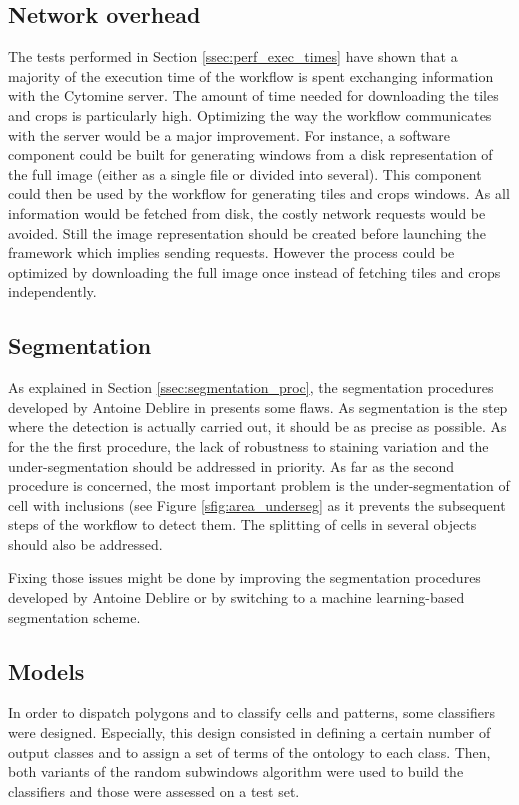 \subsection{Network overhead}
The tests performed in Section \ref{ssec:perf_exec_times} have shown that a majority of the execution time of the workflow is spent exchanging information with the Cytomine server. The amount of time needed for downloading the tiles and crops is particularly high. Optimizing the way the workflow communicates with the server would be a major improvement. For instance, a software component could be built for generating windows from a disk representation of the full image (either as a single file or divided into several). This component could then be used by the workflow for generating tiles and crops windows. As all information would be fetched from disk, the costly network requests would be avoided. Still the image representation should be created before launching the framework which implies sending requests. However the process could be optimized by downloading the full image once instead of fetching tiles and crops independently.

\subsection{Segmentation}
As explained in Section \ref{ssec:segmentation_proc}, the segmentation procedures developed by Antoine Deblire in \cite{adeblire2013} presents some flaws. As segmentation is the step where the detection is actually carried out, it should be as precise as possible. As for the the first procedure, the lack of robustness to staining variation and the under-segmentation should be addressed in priority. As far as the second procedure is concerned, the most important problem is the under-segmentation of cell with inclusions (see Figure \ref{sfig:area_underseg} as it prevents the subsequent steps of the workflow to detect them. The splitting of cells in several objects should also be addressed. 

Fixing those issues might be done by improving the segmentation procedures developed by Antoine Deblire or by switching to a machine learning-based segmentation scheme.

\subsection{Models}
In order to dispatch polygons and to classify cells and patterns, some classifiers were designed. Especially, this design consisted in defining a certain number of output classes and to assign a set of terms of the ontology to each class. Then, both variants of the random subwindows algorithm were used to build the classifiers and those were assessed on a test set. 

